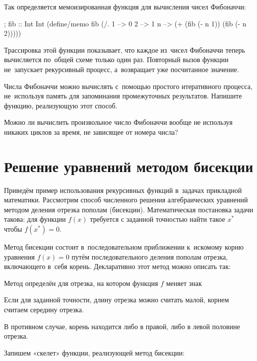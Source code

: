Так определяется мемоизированная функция для вычисления чисел Фибоначчи:
\begin{Definition}
; fib :: Int \arrow Int
(define/memo fib
  (/. 1 --> 0
      2 --> 1
      n --> (+ (fib (- n 1)) 
               (fib (- n 2)))))
\end{Definition}\newpage

Трассировка этой функции показывает, что каждое из~чисел Фибоначчи теперь вычисляется по~общей схеме только один раз. Повторный вызов функции  не~запускает рекурсивный процесс, а~возвращает уже посчитанное значение.

\begin{Assignment}

Числа Фибоначчи можно вычислять с~помощью простого итеративного процесса, не~используя память для запоминания промежуточных результатов. Напишите функцию, реализующую этот способ.

Можно ли вычислить произвольное число Фибоначчи вообще не используя никаких циклов за время, не зависящее от номера числа?
\end{Assignment}

\section{Решение уравнений методом бисекции}%
Приведём пример использования рекурсивных функций в~задачах прикладной математики. Рассмотрим способ численного решения алгебраических уравнений методом деления отрезка пополам (бисекции). Математическая постановка задачи такова: для функции $f(x)$ требуется с заданной точностью найти такое $x^*$ чтобы $f(x^*) = 0$.

\label{bisection}Метод бисекции состоит в~последовательном приближении к~искомому корню уравнения $f(x) = 0$ путём последовательного деления пополам отрезка, включающего в~себя корень. Декларативно этот метод можно описать так:

\begin{Algorythm}
  \item Метод определён для отрезка, на котором функция $f$ меняет знак
  \item Если для заданной точности, длину отрезка можно считать малой, корнем считаем середину отрезка.
  \item В противном случае, корень находится либо в правой, либо в левой половине отрезка.
\end{Algorythm}

Запишем «скелет» функции, реализующей метод бисекции:

